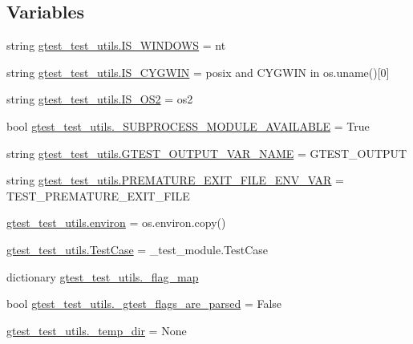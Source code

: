 \subsection*{Variables}
\begin{DoxyCompactItemize}
\item 
string \mbox{\hyperlink{namespacegtest__test__utils_a7555b17006f1c078cda336750b8613e0}{gtest\+\_\+test\+\_\+utils.\+I\+S\+\_\+\+W\+I\+N\+D\+O\+WS}} = \textquotesingle{}nt\textquotesingle{}
\item 
string \mbox{\hyperlink{namespacegtest__test__utils_a6a936096debb3c2e807d000f76245740}{gtest\+\_\+test\+\_\+utils.\+I\+S\+\_\+\+C\+Y\+G\+W\+IN}} = \textquotesingle{}posix\textquotesingle{} and \textquotesingle{}C\+Y\+G\+W\+IN\textquotesingle{} in os.\+uname()\mbox{[}0\mbox{]}
\item 
string \mbox{\hyperlink{namespacegtest__test__utils_a6f3472370693d96429867f227bccbd75}{gtest\+\_\+test\+\_\+utils.\+I\+S\+\_\+\+O\+S2}} = \textquotesingle{}os2\textquotesingle{}
\item 
bool \mbox{\hyperlink{namespacegtest__test__utils_a530084b4f71f3cba76ea2d360fc9b245}{gtest\+\_\+test\+\_\+utils.\+\_\+\+S\+U\+B\+P\+R\+O\+C\+E\+S\+S\+\_\+\+M\+O\+D\+U\+L\+E\+\_\+\+A\+V\+A\+I\+L\+A\+B\+LE}} = True
\item 
string \mbox{\hyperlink{namespacegtest__test__utils_aeb3755b4dd33aabe1baee781fecc1e66}{gtest\+\_\+test\+\_\+utils.\+G\+T\+E\+S\+T\+\_\+\+O\+U\+T\+P\+U\+T\+\_\+\+V\+A\+R\+\_\+\+N\+A\+ME}} = \textquotesingle{}G\+T\+E\+S\+T\+\_\+\+O\+U\+T\+P\+UT\textquotesingle{}
\item 
string \mbox{\hyperlink{namespacegtest__test__utils_aa961c38a16224b2e7fd8c93fc1d2a90f}{gtest\+\_\+test\+\_\+utils.\+P\+R\+E\+M\+A\+T\+U\+R\+E\+\_\+\+E\+X\+I\+T\+\_\+\+F\+I\+L\+E\+\_\+\+E\+N\+V\+\_\+\+V\+AR}} = \textquotesingle{}T\+E\+S\+T\+\_\+\+P\+R\+E\+M\+A\+T\+U\+R\+E\+\_\+\+E\+X\+I\+T\+\_\+\+F\+I\+LE\textquotesingle{}
\item 
\mbox{\hyperlink{namespacegtest__test__utils_ab0f2d4a3e90400abb93fd0808047a0a4}{gtest\+\_\+test\+\_\+utils.\+environ}} = os.\+environ.\+copy()
\item 
\mbox{\hyperlink{namespacegtest__test__utils_acb97a85206c09d233db6c7f2362e5428}{gtest\+\_\+test\+\_\+utils.\+Test\+Case}} = \+\_\+test\+\_\+module.\+Test\+Case
\item 
dictionary \mbox{\hyperlink{namespacegtest__test__utils_a2493ee5c4436cfb8b6746e3da0a5d9a1}{gtest\+\_\+test\+\_\+utils.\+\_\+flag\+\_\+map}}
\item 
bool \mbox{\hyperlink{namespacegtest__test__utils_acdfe69fc5c1efd784fca3cc8a4f29429}{gtest\+\_\+test\+\_\+utils.\+\_\+gtest\+\_\+flags\+\_\+are\+\_\+parsed}} = False
\item 
\mbox{\hyperlink{namespacegtest__test__utils_a63e521665d381cdeddd27066f11bdbbf}{gtest\+\_\+test\+\_\+utils.\+\_\+temp\+\_\+dir}} = None
\end{DoxyCompactItemize}
